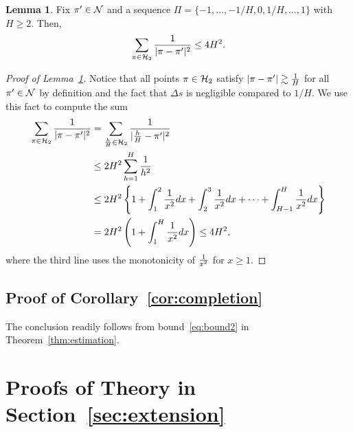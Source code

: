 \documentclass[twoside,11pt]{article}
\theoremstyle{definition}
\newtheorem{lem}{Lemma}
\begin{document}
\begin{lem}\label{lem:H}
Fix $\pi'\in\mathcal{N}$ and a sequence $\Pi=\{-1,\ldots,-1/H,0,1/H,\ldots,1\}$ with $H\geq 2$. Then, 
\[
\sum_{\pi \in \mathcal{H}_2}{1\over 
|\pi-\pi'|^2}\leq 4H^2. 
\]
\end{lem}
\begin{proof}[Proof of Lemma~\ref{lem:H}]
Notice that all points $\pi\in\mathcal{H}_2$ satisfy $|\pi-\pi'|\gtrsim{1\over H}$ for all $\pi'\in\mathcal{N}$ by definition and the fact that $\Delta s$ is negligible compared to $1/H$. We use this fact to compute the sum
\begin{align}
   \sum_{\pi \in \mathcal{H}_2}{1\over |\pi-\pi'|^2}&= \sum_{\frac{h}{H}\in\mathcal{H}_2 } {1\over |\frac{h}{H}-\pi'|^2}\\
   &\leq 2H^2\sum_{h=1}^{H}{1 \over h^2}\\
 &\leq 2H^2\left\{ 1+\int_{1}^2{1\over x^2}dx+ \int_{2}^3{1\over x^2}dx+\cdots + \int_{H-1}^H{1\over x^2}dx\right\}\\
&= 2H^2\left(1+\int^{H}_{1}{1\over x^2}dx\right) \leq 4H^2,
\end{align}
 where the third line uses the monotonicity of ${1\over x^2}$ for $x\geq 1$. 
 \end{proof}
 
\subsection{Proof of Corollary~\ref{cor:completion}}
The conclusion readily follows from bound~\eqref{eq:bound2} in Theorem~\ref{thm:estimation}. 

\section{Proofs of Theory in Section~\ref{sec:extension}}
\end{document}
